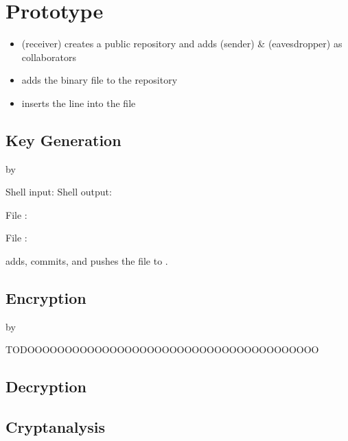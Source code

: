 \section{Prototype}

\begin{itemize}
\item \bob{} (receiver)
  creates a public \github{} repository and
  adds \alice{} (sender) \& \eve{} (eavesdropper)
  as collaborators
\item \bob{} adds the binary file \cryout{}
  to the repository
\item \bob{} inserts the line 
  into the file 
\end{itemize}


\subsection{Key Generation}
by \bob \bigskip

Shell input: \generatekeysindemo
Shell output: \generatekeysoutdemo

File \private{\bobdemo}:
\codestt{}

File \public{\bobdemo}:
\codestt{}

\bob{} adds, commits, and pushes
the file \public{\bobdemo} to \github.


\subsection{Encryption}
by \alice \bigskip

TODOOOOOOOOOOOOOOOOOOOOOOOOOOOOOOOOOOOOOOO

\encryptindemo
\encryptoutdemo


\subsection{Decryption}

\bob
\decryptindemo
\decryptoutdemo


\subsection{Cryptanalysis}

\eve
\cryptanalyzeindemo
\cryptanalyzeoutdemo
